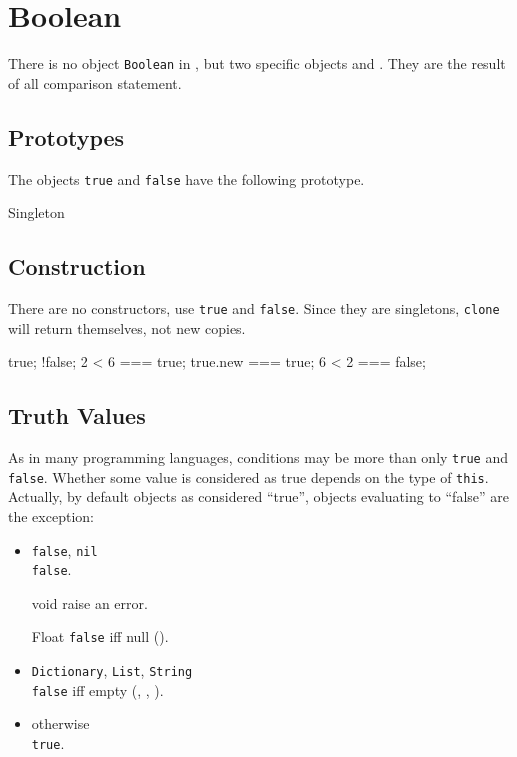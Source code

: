 
\section{Boolean}

There is no object \lstinline|Boolean| in \us, but two specific
objects  and .  They are the result of
all comparison statement.


\subsection{Prototypes}

The objects \lstinline|true| and \lstinline|false| have the following
prototype.

\begin{refObjects}
\item[Singleton]
\end{refObjects}

\subsection{Construction}

There are no constructors, use \lstinline|true| and \lstinline|false|.
Since they are singletons, \lstinline|clone| will return themselves,
not new copies.

\begin{urbiassert}[firstnumber=1]
true;
!false;
2 < 6 === true;
true.new === true;
6 < 2 === false;
\end{urbiassert}

\subsection{Truth Values}
\label{sec:truth}

As in many programming languages, conditions may be more than only
\lstinline|true| and \lstinline|false|.  Whether some value is
considered as true depends on the type of \lstinline|this|.  Actually,
by default objects as considered ``true'', objects evaluating to
``false'' are the exception:
\begin{itemize}
\item \lstinline|false|, \lstinline|nil|\\
  \lstinline|false|.
\item[void]
  raise an error.
\item[Float]
  \lstinline|false| iff null ().
\item \lstinline|Dictionary|, \lstinline|List|,  \lstinline|String|\\
  \lstinline|false| iff empty (,
  , ).
\item otherwise\\
  \lstinline|true|.
\end{itemize}

